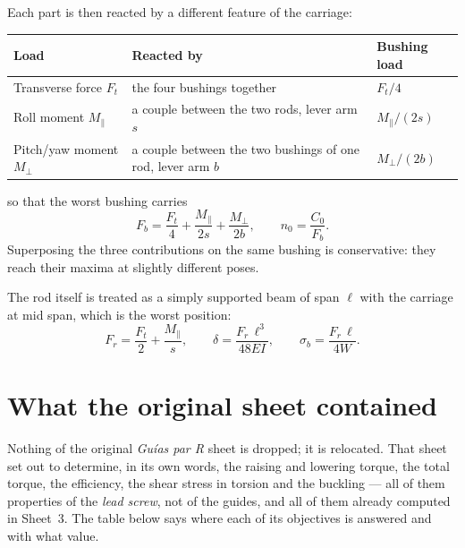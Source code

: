 \documentclass[11pt]{article}
\begin{document}
Each part is then reacted by a different feature of the carriage:

\begin{center}
\begin{tabular}{@{}l>{\raggedright\arraybackslash}p{5.9cm}l@{}}
\toprule
\textbf{Load} & \textbf{Reacted by} & \textbf{Bushing load} \\
\midrule
Transverse force $F_t$ & the four bushings together        & $F_t/4$ \\
Roll moment $M_{\parallel}$ & a couple between the two rods, lever arm $s$ & $M_{\parallel}/(2s)$ \\
Pitch/yaw moment $M_{\perp}$ & a couple between the two bushings of one rod, lever arm $b$ & $M_{\perp}/(2b)$ \\
\bottomrule
\end{tabular}
\end{center}

so that the worst bushing carries
\begin{equation}
F_{b} = \frac{F_t}{4} + \frac{M_{\parallel}}{2s} + \frac{M_{\perp}}{2b},
\qquad n_0 = \frac{C_0}{F_b}.
\label{eq:bushing}
\end{equation}
Superposing the three contributions on the same bushing is conservative: they reach their
maxima at slightly different poses.

The rod itself is treated as a simply supported beam of span $\ell$ with the carriage at
mid span, which is the worst position:
\begin{equation}
F_{r} = \frac{F_t}{2} + \frac{M_{\parallel}}{s},
\qquad
\delta = \frac{F_r\,\ell^{3}}{48EI},
\qquad
\sigma_b = \frac{F_r\,\ell}{4W}.
\end{equation}

\section{What the original sheet contained}\label{sec:gui-orig}

Nothing of the original \emph{Gu\'ias par R} sheet is dropped; it is relocated. That sheet
set out to determine, in its own words, the raising and lowering torque, the total torque,
the efficiency, the shear stress in torsion and the buckling --- all of them properties of
the \emph{lead screw}, not of the guides, and all of them already computed in Sheet~3.
The table below says where each of its objectives is answered and with what value.
\end{document}

